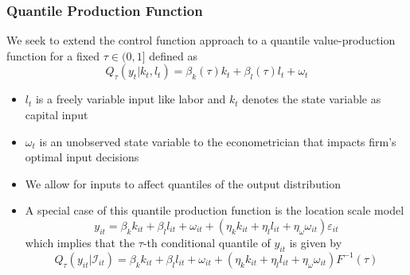 \documentclass{beamer}
\begin{document}

\begin{frame}
\frametitle{Quantile Production Function}
We seek to extend the control function approach to a quantile value-production function for a fixed $\tau\in(0,1]$ defined as
\begin{equation}
	Q_{\tau}(y_{t}|k_{t}, l_{t})=\beta_{k}(\tau)k_{t}+\beta_{l}(\tau)l_{t}+\omega_{t}
\end{equation}
\begin{itemize}
	\item $l_{t}$ is a freely variable input like labor and $k_{t}$ denotes the state variable as capital input
	\item $\omega_{t}$ is an unobserved state variable to the econometrician that impacts firm's optimal input decisions
	\item We allow for inputs to affect quantiles of the output distribution
	\item A special case of this quantile production function is the location scale model
	\begin{equation}
	 y_{it}=\beta_{k}k_{it}+\beta_{l}l_{it}+\omega_{it}+(\eta_{k}k_{it}+\eta_{l}l_{it}+\eta_{\omega}\omega_{it})\varepsilon_{it}
	\end{equation}
	which implies that the $\tau$-th conditional quantile of $y_{it}$ is given by
	\begin{equation}
	Q_{\tau}(y_{it}|\mathcal{I}_{it})=\beta_{k}k_{it}+\beta_{l}l_{it}+\omega_{it}+(\eta_{k}k_{it}+\eta_{l}l_{it}+\eta_{\omega}\omega_{it})F^{-1}(\tau)
	\end{equation}
\end{itemize}
\end{frame}
\end{document}
